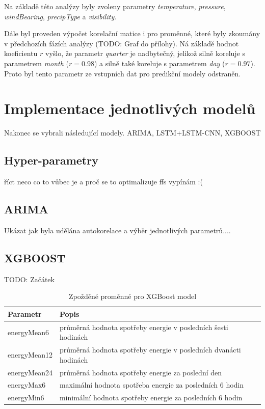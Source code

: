 \documentclass[FM,BP,fonts]{tulthesis}
\begin{document}
Na základě této analýzy byly zvoleny parametry \textit{temperature}, \textit{pressure}, \textit{windBearing}, \textit{precipType} a \textit{visibility}.

Dále byl proveden výpočet korelační matice i pro proměnné, které byly zkoumány v předchozích fázích analýzy (TODO: Graf do přílohy). Ná základě hodnot koeficientu $r$ vyšlo, že parametr \textit{quarter} je nadbytečný, jelikož silně koreluje s parametrem \textit{month} ($r=0.98$) a silně také koreluje s parametrem \textit{day} ($r=0.97$). Proto byl tento parametr ze vstupních dat pro predikční modely odstraněn.




\newpage

\section{Implementace jednotlivých modelů}
Nakonec se vybrali následující modely. ARIMA, LSTM+LSTM-CNN, XGBOOST

\subsection{Hyper-parametry}
říct neco co to vůbec je a proč se to optimalizuje ffs vypínám :(


\subsection{ARIMA}
Ukázat jak byla udělána autokorelace a výběr jednotlivých parametrů....
\subsection{XGBOOST}
TODO: Začátek
\begin{table}[!ht]
	\centering
	\caption{Zpožděné proměnné pro XGBoost model}
	
	\begin{tabular}{ll}
		\hline
		\textbf{Parametr} & \textbf{Popis} \\ \hline
		
		energyMean6 & průměrná hodnota spotřeby energie v posledních šesti hodinách \\
		
		energyMean12 & průměrná hodnota spotřeby energie v posledních dvanácti hodinách \\
		energyMean24 & průměrná hodnota spotřeby energie za poslední den \\
		energyMax6 & maximální hodnota spotřeba energie za posledních 6 hodin\\
		energyMin6 & minimální hodnota spotřeby energie za posledních 6 hodin\\
		
	\end{tabular}
\end{table}
\end{document}
